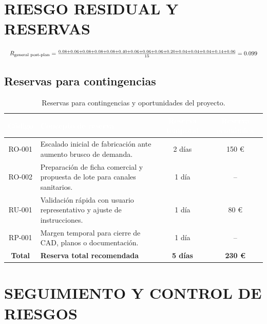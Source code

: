 \documentclass[11pt,a4paper]{article}
\begin{document}
\newpage

\section{RIESGO RESIDUAL Y RESERVAS}

\[
\resizebox{\textwidth}{!}{$
R_{\text{general post-plan}} =
\frac{0.08 + 0.06 + 0.08 + 0.08 + 0.08 + 0.40 + 0.06 + 0.06 + 0.06 + 0.20 + 0.04 + 0.04 + 0.04 + 0.14 + 0.06}{15}
= 0.099
$}
\]

\subsection{Reservas para contingencias}

\begin{table}[H]
\centering
\renewcommand{\arraystretch}{1.3}
\caption{Reservas para contingencias y oportunidades del proyecto.}
\label{tab:reservas}
\begin{tabularx}{\textwidth}{|c|X|c|c|}
\hline
\rowcolor{ArthroNavy}
\textcolor{white}{\textbf{Código}} &
\textcolor{white}{\textbf{Concepto de reserva}} &
\textcolor{white}{\textbf{Reserva temporal}} &
\textcolor{white}{\textbf{Reserva económica}} \\
\hline
RO-001 & Escalado inicial de fabricación ante aumento brusco de demanda. & 2 días & 150 € \\
\hline
RO-002 & Preparación de ficha comercial y propuesta de lote para canales sanitarios. & 1 día & -- \\
\hline
RU-001 & Validación rápida con usuario representativo y ajuste de instrucciones. & 1 día & 80 € \\
\hline
RP-001 & Margen temporal para cierre de CAD, planos o documentación. & 1 día & -- \\
\hline
\rowcolor{ArthroTeal!20}
\textbf{Total} & \textbf{Reserva total recomendada} & \textbf{5 días} & \textbf{230 €} \\
\hline
\end{tabularx}
\end{table}

\section{SEGUIMIENTO Y CONTROL DE RIESGOS}
\end{document}
